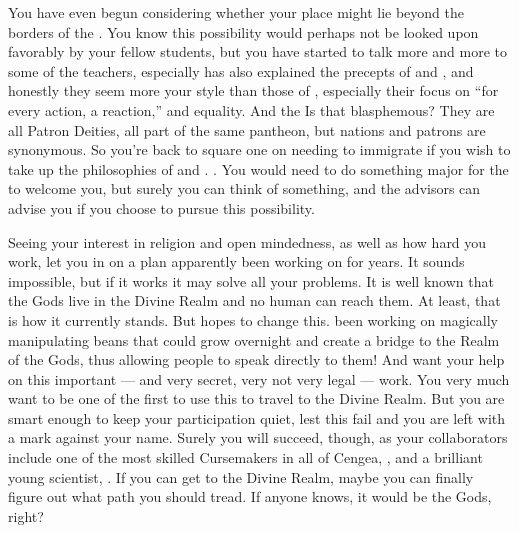 \documentclass[char]{GL2020}
\begin{document}
You have even begun considering whether your place might lie beyond the borders of the \pTech{}. You know this possibility would perhaps not be looked upon favorably by your fellow \pTech{} students, but you have started to talk more and more to some of the \pShip{} teachers, especially \cFlowPriest{} has also explained the precepts of \cEbb{} and \cFlow{}, and honestly they seem more your style than those of \cTechGod{}, especially their focus on “for every action, a reaction,” and equality. And the  Is that blasphemous? They are all Patron Deities, all part of the same pantheon, but nations and patrons are synonymous. So you’re back to square one on needing to immigrate if you wish to take up the philosophies of \cEbb{} and \cFlow{}. . You would need to do something major for the \pShippies{} to welcome you, but surely you can think of something, and the \pShippie{} advisors can advise you if you choose to pursue this possibility.


Seeing your interest in \cFlowPriest{\their} religion and open mindedness, as well as how hard you work, \cFlowPriest{\they} let you in on a plan \cFlowPriest{\theyhave} apparently been working on for years. It sounds impossible, but if it works it may solve all your problems. It is well known that the Gods live in the Divine Realm and no human can reach them. At least, that is how it currently stands. But \cFlowPriest{} hopes to change this. \cFlowPriest{\Theyhave} been working on magically manipulating beans that could grow overnight and create a bridge to the Realm of the Gods, thus allowing people to speak directly to them! And \cFlowPriest{\they} want\cFlowPriest{\verbs} your help on this important — and very secret, very not very legal — work. You very much want to be one of the first to use this to travel to the Divine Realm. But you are smart enough to keep your participation quiet, lest this fail and you are left with a mark against your name. Surely you will succeed, though, as your collaborators include one of the most skilled Cursemakers in all of Cengea, \cCurse{\full}, and a brilliant young \pTech{} scientist, \cAssistantScientist{\full}. If you can get to the Divine Realm, maybe you can finally figure out what path you should tread. If anyone knows, it would be the Gods, right? 
\end{document}
